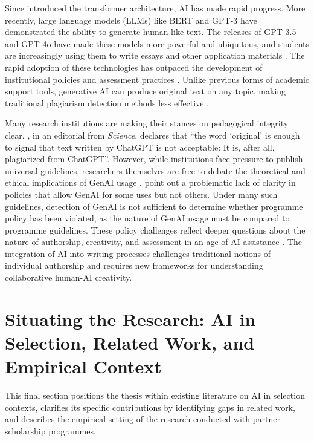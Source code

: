 Since \textcite{ashish_vaswani_attention_2017} introduced the transformer architecture, AI has made rapid progress. More recently, large language models (LLMs) like BERT \cite{jacob_devlin_bert_2018} and GPT-3 \cite{brown_language_2020} have demonstrated the ability to generate human-like text. The releases of GPT-3.5 and GPT-4o have made these models more powerful and ubiquitous, and students are increasingly using them to write essays and other application materials \cite{openai_gpt-4_2023,dehouche_plagiarism_2021}. The rapid adoption of these technologies has outpaced the development of institutional policies and assessment practices \cite{cotton2023chatting}. Unlike previous forms of academic support tools, generative AI can produce original text on any topic, making traditional plagiarism detection methods less effective \cite{mitchell_detectgpt_2023}.

Many research institutions are making their stances on pedagogical integrity clear. \textcite{h_holden_thorp_chatgpt_2023}, in an editorial from \emph{Science}, declares that ``the word `original' is enough to signal that text written by ChatGPT is not acceptable: It is, after all, plagiarized from ChatGPT''. However, while institutions face pressure to publish universal guidelines, researchers themselves are free to debate the theoretical and ethical implications of GenAI usage \cite{lav_r_varshney_limits_2020,h_holden_thorp_chatgpt_2023,yu_huang_reflection_2023}. \textcite{MikePerkins_JasperRoe_2023} point out a problematic lack of clarity in policies that allow GenAI for some uses but not others. Under many such guidelines, detection of GenAI is not sufficient to determine whether programme policy has been violated, as the nature of GenAI usage must be compared to programme guidelines. These policy challenges reflect deeper questions about the nature of authorship, creativity, and assessment in an age of AI assistance \cite{catherine_a_gao_comparing_2022, hu_challenges_2023}. The integration of AI into writing processes challenges traditional notions of individual authorship and requires new frameworks for understanding collaborative human-AI creativity.

\section{Situating the Research: AI in Selection, Related Work, and Empirical Context}\label{sec:context_situating_research}

This final section positions the thesis within existing literature on AI in selection contexts, clarifies its specific contributions by identifying gaps in related work, and describes the empirical setting of the research conducted with partner scholarship programmes.

